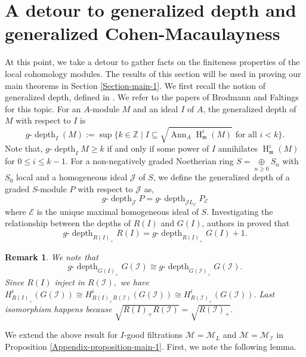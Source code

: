 \documentclass[11pt,reqno]{amsart}
\newtheorem{remark}[theorem]{Remark}
\theoremstyle{definition}
\newcommand{\m}{\mathfrak m}
\def\M{{\mathcal M}}
\def\I{{\mathcal I}}
\DeclareMathOperator{\h}{H}
\DeclareMathOperator{\depth}{depth}
\DeclareMathOperator{\ann}{Ann}
\numberwithin{equation}{section}
\begin{document}
\section{A detour to generalized depth and generalized Cohen-Macaulayness}\label{Section-detour}
At this point, we take a detour to gather facts on the finiteness properties of the local cohomology modules. The results of this section will be used in proving our main theorems in Section \ref{Section-main-1}. We first recall the notion of generalized depth, defined in \cite{HM94}. We refer to  the papers of
	Brodmann \cite{Brodmann} and Faltings \cite{Faltings} for this topic.  
	For an $A$-module $M$  and an ideal $I$ of $A$, the generalized depth of $M$ with respect to $I$ is 
	$$g\text{-} \depth_I(M):=\sup\{k\in\mathbb{Z}\mid I\subseteq \sqrt{\ann_A\h_{\m}^i(M)} \text{ for all }i<k\}.$$
	Note that, $g\text{-}\depth_I M\geq k$ if and only if some power of $I$ annihilates $\h_\m^i(M)$ for $0\leq i\leq k-1.$
	For a  non-negatively graded Noetherian ring  $S=\mathop\oplus\limits_{n\geq 0} S_n$  with $S_0$ local and a homogeneous ideal $\mathcal{J}$ of $S$, we define the generalized depth of a graded $S$-module $P$ with respect to 
	$\mathcal{J}$ as, $$g\text{-}\depth_{\mathcal{J}} P=g\text{-}\depth_{\mathcal{J}L_\mathcal{E}} P_\mathcal{E}$$
	where $\mathcal{E}$ is the unique maximal homogeneous ideal of $S$. Investigating the relationship between the depths of $R(I)$ and $G(I)$, authors in  \cite[Proposition 3.2]{HM94} proved that 
	$$g\text{-}\depth_{R(I)_+} R(I)= g\text{-}\depth_{R(I)_+} G(I)+1.$$
    \begin{remark}
        We note that $$g\text{-} \depth_{G(I)_+} G(\I)\cong g\text{-} \depth_{G(\I)_+} G(\I). $$
        Since $R(I)$ inject in $R(\I),$ we have $H^i_{R(I)_+}(G(\I))\cong H^i_{R(I)_+R(\I)}(G(\I))\cong H^i_{R(\I)_+}(G(\I)).$ Last isomorphism happens because $\sqrt{R(I)_+R(\I)}=\sqrt{R(\I)_+}.$
    \end{remark}
	We extend the above result for $I$-good filtrations $\M=\M_L$ and $\M=\M_\I$ in Proposition \ref{Appendix-proposition-main-1}. First, we note the following lemma.
	
	
\end{document}
